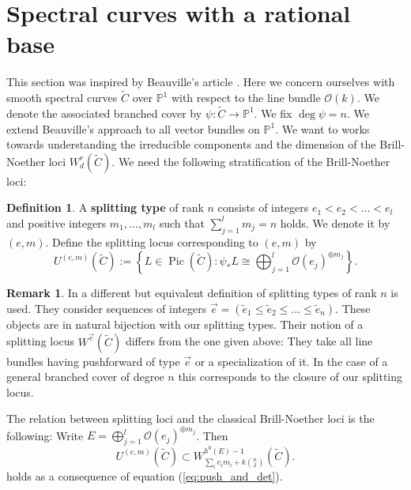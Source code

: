 \documentclass[12pt]{extarticle}
\theoremstyle{definition}
\newtheorem{definition}[theorem]{Definition}
\newtheorem{remark}[theorem]{Remark}
\numberwithin{theorem}{section}
\newcommand{\PP}{\mathbb{P}}
\newcommand{\OO}{\mathcal{O}}
\newcommand{\op}{\operatorname}
\renewcommand{\tilde}{\widetilde}		%
\begin{document}
\section{Spectral curves with a rational base}\label{section:rat_base}
This section was inspired by Beauville's article \cite{Beauville2}.
Here we concern ourselves with smooth spectral curves $\tilde{C}$ over $\PP^1$ with respect to the line bundle $\OO(k)$. We denote the associated branched cover by $\psi: \tilde{C} \rightarrow \PP^1$. We fix $\deg \psi = n$. We extend Beauville's approach to all vector bundles on $\PP^1$. We want to works towards understanding the irreducible components and the dimension of the Brill-Noether loci $W^r_d(\tilde{C})$.  We need the following stratification of the Brill-Noether loci: 
\begin{definition}
A \textbf{splitting type} of rank $n$ consists of integers $e_1 < e_2 < \ldots < e_l$ and positive integers $m_1,\ldots,m_l$ such that $\sum_{j=1}^l m_j = n$ holds. We denote it by $(e,m)$. Define the splitting locus corresponding to $(e,m)$ by 
\begin{equation}
U^{(e,m)}(\tilde{C}) := 	\left\{ L \in \op{Pic}(\tilde{C}) : \psi_*L \cong \bigoplus_{j=1}^l \OO(e_j)^{\oplus m_j} \right\}.
\end{equation} 
\end{definition}
\begin{remark}
In  \cite{LLV} a different but equivalent definition of splitting types of rank $n$ is used. They consider sequences of integers $\vec{e} = (\tilde{e}_1 \leq \tilde{e}_2 \leq \ldots \leq \tilde{e}_n)$. These objects are in natural bijection with our splitting types.  
Their notion of a splitting locus $W^{\vec{e}}(\tilde{C})$ differs from the one given above: They take all line bundles having pushforward of type $\vec{e}$ or a specialization of it. In the case of a general branched cover of degree $n$ this corresponds to the closure of our splitting locus. 
\end{remark}
The relation between splitting loci and the classical Brill-Noether loci is the following: Write $E = \bigoplus_{j=1}^l \OO(e_j)^{\oplus m_j}$. Then
\begin{equation*}
U^{(e,m)}(\tilde{C}) \subset W^{h^0(E) -1}_{\sum_i e_im_i + k\binom{n}{2}}(\tilde{C}).
\end{equation*} 
holds as a consequence of equation (\ref{eq:push_and_det}).
\end{document}
